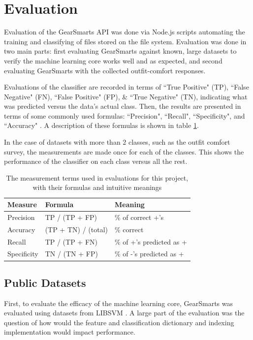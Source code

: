 \section{Evaluation}
\label{section:evaluation}
Evaluation of the GearSmarts API was done via Node.js scripts automating the training and classifying of files
stored on the file system. Evaluation was done in two main parts: first evaluating GearSmarts against known, large datasets
to verify the machine learning core works well and as expected, and second evaluating GearSmarts with the collected
outfit-comfort responses.

Evaluations of the classifier are recorded in terms of ``True Positive" (TP), ``False Negative" (FN), ``False Positive"
(FP), \& ``True Negative" (TN), indicating what was predicted versus the data's actual class. Then, the results are
presented in terms of some commonly used formulas: ``Precision", ``Recall", ``Specificity", and ``Accuracy"
\cite{measures}. A description of these formulas is shown in table \ref{table:measures}.

In the case of datasets with more than 2 classes, such as the outfit comfort survey, the measurements are made once for
each of the classes. This shows the performance of the classifier on each class versus all the rest.

\begin{table}
    \begin{tabular}{lll}
        \hline
        \textbf{Measure} & \textbf{Formula} & \textbf{Meaning} \\ [0.5ex]
        \hline\hline
        Precision	& TP / (TP + FP) & \% of correct +'s \\
        Accuracy	& (TP + TN) / (total) & \% correct \\
        Recall 	    & TP / (TP + FN) & \% of +'s predicted as + \\
        Specificity	& TN / (TN + FP) & \% of -'s predicted as + \\
        \hline
    \end{tabular}
    \caption{The measurement terms used in evaluations for this project, with their formulas and intuitive meanings}
    \label{table:measures}
\end{table}

\subsection{Public Datasets}
\label{subsection:publicdatasets}
First, to evaluate the efficacy of the machine learning core, GearSmarts was evaluated using datasets from LIBSVM \cite{libsvm:datasets}.
A large part of the evaluation was the question of how would the feature and classification dictionary and indexing implementation
would impact performance.

